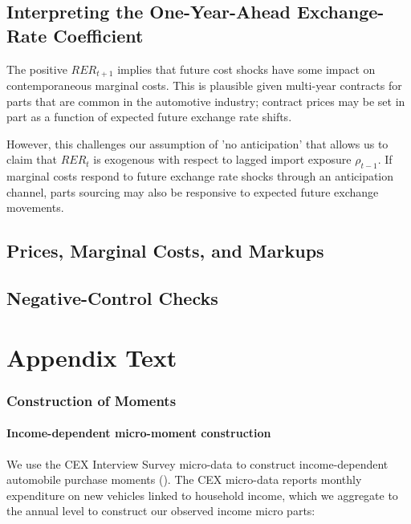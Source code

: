 \documentclass[11pt]{article}
\begin{document}
\clearpage



\clearpage
\subsection{Interpreting the One-Year-Ahead Exchange-Rate Coefficient}

The positive \(RER_{t+1}\) implies that future cost shocks have some impact on contemporaneous marginal costs. This is plausible given multi-year contracts for parts that are common in the automotive industry; contract prices may be set in part as a function of expected future exchange rate shifts. 

However, this challenges our assumption of 'no anticipation' that allows us to claim that $RER_t$ is exogenous with respect to lagged import exposure $\rho_{t-1}$. If marginal costs respond to future exchange rate shocks through an anticipation channel, parts sourcing may also be responsive to expected future exchange movements.


\subsection{Prices, Marginal Costs, and Markups}



\clearpage

\subsection{Negative-Control Checks}





\clearpage
\section{Appendix Text}
\subsubsection{Construction of Moments}\label{sec:appendix_moments}
\paragraph{Income-dependent micro-moment construction}

We use the CEX Interview Survey micro-data to construct income-dependent automobile purchase moments (\cite{bureau_of_labor_statistics_public_2025}). The CEX micro-data reports monthly expenditure on new vehicles linked to household income, which we aggregate to the annual level to construct our observed income micro parts:
\end{document}
